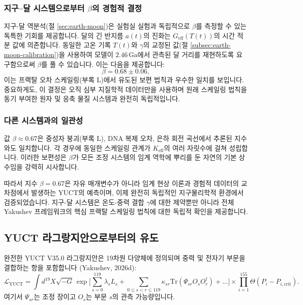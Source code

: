 \documentclass[11pt,a4paper]{article}
\newcommand{\lagr}{\mathcal{L}}
\begin{document}
	\subsubsection{지구–달 시스템으로부터 $\beta$의 경험적 결정}
	지구-달 역분석(절 \ref{sec:earth-moon})은 실험실 실험과 독립적으로 $\beta$를 측정할 수 있는 독특한 기회를 제공합니다. 달의 긴 반지름 $a(t)$의 진화는 $G_{\mathrm{eff}}(T(t))$의 시간 적분 값에 의존합니다. 동일한 고온 기록 $T(t)$와 $\gamma$의 교정된 값(절 \ref{subsec:earth-moon-calibration})을 사용하여 모델이 $2.46\,\mathrm{Ga}$에서 관측된 달 거리를 재현하도록 요구함으로써 $\beta$를 풀 수 있습니다. 이는 다음을 제공합니다:
	\[
	\beta = 0.68 \pm 0.06,
	\]
	이는 프랙탈 오차 스케일링(부록 L)에서 유도된 보편 법칙과 우수한 일치를 보입니다. 중요하게도, 이 결정은 오직 심부 지질학적 데이터만을 사용하며 원래 스케일링 법칙을 동기 부여한 원자 및 응축 물질 시스템과 완전히 독립적입니다.
	
	\subsubsection{다른 시스템과의 일관성}
	값 $\beta \approx 0.67$은 중성자 붕괴(부록 L), DNA 복제 오차, 은하 회전 곡선에서 추론된 지수와도 일치합니다. 각 경우에 동일한 스케일링 관계가 $K_{\mathrm{eff}}$의 여러 자릿수에 걸쳐 성립합니다. 이러한 보편성은 $\beta$가 모든 조정 시스템의 임계 역학에 뿌리를 둔 자연의 기본 상수임을 강력히 시사합니다.
	
	따라서 지수 $\beta = 0.67$은 자유 매개변수가 아니라 임계 현상 이론과 경험적 데이터의 교차점에서 발생하는 YUCT의 예측이며, 이제 완전히 독립적인 지구물리학적 환경에서 검증되었습니다. 지구-달 시스템은 온도-중력 결합 $\gamma$에 대한 제약뿐만 아니라 전체 Yakushev 프레임워크의 핵심 프랙탈 스케일링 법칙에 대한 독립적 확인을 제공합니다.
	
	\subsection{YUCT 라그랑지안으로부터의 유도}
	\label{subsec:lagrangian-derivation}
	
	완전한 YUCT V35.0 라그랑지안은 19차원 다양체에 정의되며 중력 및 전자기 부문을 결합하는 항을 포함합니다 (Yakushev, 2026d):
	\begin{equation}
		\lagr_{\text{YUCT}} = \int d^{19}X \sqrt{-G} \, 
		\exp\Bigg[ \sum_{s=0}^{119} \lambda_s L_s + \sum_{0\le s<r\le119} \kappa_{sr} \mathrm{Tr}(\Psi_{sr} O_s O_r^\dagger) + \dots \Bigg]
		\times \prod_{i=1}^{155} \Theta(P_i - P_{i,\text{crit}}).
		\label{eq:lagrangian-full}
	\end{equation}
	여기서 $\Psi_{sr}$는 조정 장이고 $O_s$는 부문 $s$의 관측 가능량입니다.
	
\end{document}
